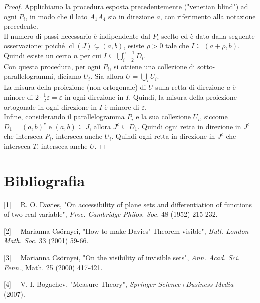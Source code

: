 \documentclass[a4paper, twoside]{article}
\newcommand{\<}{\langle}
\renewcommand{\>}{\rangle}
\begin{document}
\begin{proof}
	Applichiamo la procedura esposta precedentemente ("venetian blind") ad ogni $P_i$, in modo che il lato $A_1A_4$ sia in direzione $a$, con riferimento alla notazione precedente.\\
	Il numero di passi necessario è indipendente dal $P_i$ scelto ed è dato dalla seguente osservazione: poiché $\operatorname{cl}(J) \subsetneq(a, b)$, esiste $\rho >0$ tale che $I \subseteq (a+\rho,b)$. Quindi esiste un certo $n$ per cui $I \subseteq \bigcup_{i=2}^{n+1}D_i$.\\
	Con questa procedura, per ogni $P_i$, si ottiene una collezione di sotto-parallelogrammi, diciamo $U_i$. Sia allora $U = \bigcup_i U_i$.\\
	La misura della proiezione (non ortogonale) di $U$ sulla retta di direzione $a$ è minore di $2 \cdot \frac{1}{2} \varepsilon=\varepsilon$ in ogni direzione in $I$. Quindi, la misura della proiezione ortogonale in ogni direzione in $I$ è minore di $\varepsilon$.\\
	Infine, considerando il parallelogramma $P_i$ e la sua collezione $U_i$, siccome $D_1 =(a,b)^c$ e $(a,b) \subseteq J$, allora $J^c \subseteq D_1$. Quindi ogni retta in direzione in $J^c$ che interseca $P_i$, interseca anche $U_i$. Quindi ogni retta in direzione in $J^c$ che interseca $T$, interseca anche $U$. 
\end{proof}

\newpage

\section{Bibliografia}

[1] \ \ R. O. Davies, "On accessibility of plane sets and differentiation
of functions of two real variable", \emph{Proc. Cambridge Philos. Soc.} 48 (1952) 215-232.

[2] \ \ Marianna Cs\"{o}rnyei, "How to make Davies' Theorem visible", \emph{Bull. London Math. Soc.} 33 (2001) 59-66.

[3] \ \ Marianna Cs\"{o}rnyei, "On the visibility of invisible sets",
\emph{Ann. Acad. Sci. Fenn.}, Math. 25 (2000) 417-421.

[4] \ \ V. I. Bogachev, "Measure Theory", \emph{Springer Science+Business Media} (2007). 
\end{document}

